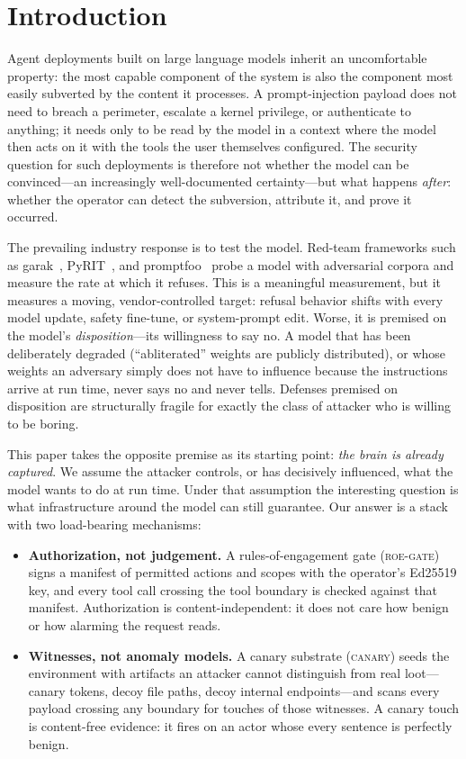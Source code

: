 \documentclass[11pt,a4paper]{article}
\newcommand{\gate}{\textsc{roe-gate}}
\newcommand{\canary}{\textsc{canary}}
\begin{document}
\section{Introduction}\label{sec:intro}

Agent deployments built on large language models inherit an uncomfortable
property: the most capable component of the system is also the component most
easily subverted by the content it processes. A prompt-injection payload does
not need to breach a perimeter, escalate a kernel privilege, or authenticate to
anything; it needs only to be read by the model in a context where the model
then acts on it with the tools the user themselves configured. The security
question for such deployments is therefore not whether the model can be
convinced---an increasingly well-documented certainty---but what happens
\emph{after}: whether the operator can detect the subversion, attribute it, and
prove it occurred.

The prevailing industry response is to test the model. Red-team frameworks
such as garak~\cite{garak}, PyRIT~\cite{pyrit}, and promptfoo~\cite{promptfoo}
probe a model with adversarial corpora and measure the rate at which it
refuses. This is a meaningful measurement, but it measures a moving,
vendor-controlled target: refusal behavior shifts with every model update,
safety fine-tune, or system-prompt edit. Worse, it is premised on the model's
\emph{disposition}---its willingness to say no. A model that has been
deliberately degraded (``abliterated'' weights are publicly distributed), or
whose weights an adversary simply does not have to influence because the
instructions arrive at run time, never says no and never tells. Defenses
premised on disposition are structurally fragile for exactly the class of
attacker who is willing to be boring.

This paper takes the opposite premise as its starting point:
\emph{the brain is already captured}. We assume the attacker controls, or has
decisively influenced, what the model wants to do at run time. Under that
assumption the interesting question is what infrastructure around the model
can still guarantee. Our answer is a stack with two load-bearing mechanisms:

\begin{itemize}[leftmargin=1.6em, itemsep=0.15em]
  \item \textbf{Authorization, not judgement.} A rules-of-engagement gate
  (\gate{}) signs a manifest of permitted actions and scopes with the
  operator's Ed25519 key, and every tool call crossing the tool boundary is
  checked against that manifest. Authorization is content-independent: it
  does not care how benign or how alarming the request reads.
  \item \textbf{Witnesses, not anomaly models.} A canary substrate
  (\canary{}) seeds the environment with artifacts an attacker cannot
  distinguish from real loot---canary tokens, decoy file paths, decoy
  internal endpoints---and scans every payload crossing any boundary for
  touches of those witnesses. A canary touch is content-free evidence: it
  fires on an actor whose every sentence is perfectly benign.
\end{itemize}
\end{document}
